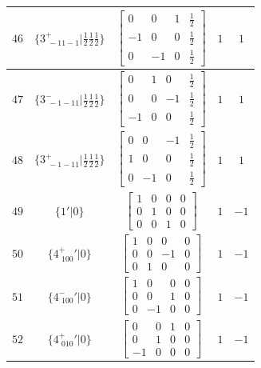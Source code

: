 \documentclass[fleqn,8pt]{jsarticle}
\begin{document}
\begin{longtable}{ccccc}
$ 46 $ & $ \{3^{+}_{\,\,-11-1}|\frac{1}{2} \frac{1}{2} \frac{1}{2}\} $ & $ \begin{bmatrix} 0 & 0 & 1 & \frac{1}{2} \\ -1 & 0 & 0 & \frac{1}{2} \\ 0 & -1 & 0 & \frac{1}{2} \end{bmatrix} $ & $ 1 $ & $ 1 $ \\ \hline
$ 47 $ & $ \{3^{-}_{\,\,-1-11}|\frac{1}{2} \frac{1}{2} \frac{1}{2}\} $ & $ \begin{bmatrix} 0 & 1 & 0 & \frac{1}{2} \\ 0 & 0 & -1 & \frac{1}{2} \\ -1 & 0 & 0 & \frac{1}{2} \end{bmatrix} $ & $ 1 $ & $ 1 $ \\ \hline
$ 48 $ & $ \{3^{+}_{\,\,-1-11}|\frac{1}{2} \frac{1}{2} \frac{1}{2}\} $ & $ \begin{bmatrix} 0 & 0 & -1 & \frac{1}{2} \\ 1 & 0 & 0 & \frac{1}{2} \\ 0 & -1 & 0 & \frac{1}{2} \end{bmatrix} $ & $ 1 $ & $ 1 $ \\ \hline
$ 49 $ & $ \{1{}'|0\} $ & $ \begin{bmatrix} 1 & 0 & 0 & 0 \\ 0 & 1 & 0 & 0 \\ 0 & 0 & 1 & 0 \end{bmatrix} $ & $ 1 $ & $ -1 $ \\ \hline
$ 50 $ & $ \{4^{+}_{\,\,100}{}'|0\} $ & $ \begin{bmatrix} 1 & 0 & 0 & 0 \\ 0 & 0 & -1 & 0 \\ 0 & 1 & 0 & 0 \end{bmatrix} $ & $ 1 $ & $ -1 $ \\ \hline
$ 51 $ & $ \{4^{-}_{\,\,100}{}'|0\} $ & $ \begin{bmatrix} 1 & 0 & 0 & 0 \\ 0 & 0 & 1 & 0 \\ 0 & -1 & 0 & 0 \end{bmatrix} $ & $ 1 $ & $ -1 $ \\ \hline
$ 52 $ & $ \{4^{+}_{\,\,010}{}'|0\} $ & $ \begin{bmatrix} 0 & 0 & 1 & 0 \\ 0 & 1 & 0 & 0 \\ -1 & 0 & 0 & 0 \end{bmatrix} $ & $ 1 $ & $ -1 $ \\ \hline

\end{longtable}
\end{document}
